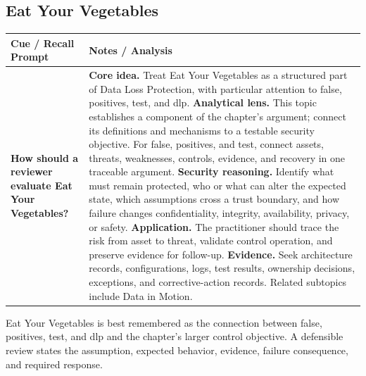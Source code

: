 \documentclass[11pt]{article}
\newcommand{\CornellHeader}{%
\rowcolor{Navy}\color{white}\bfseries Cue / Recall Prompt & \color{white}\bfseries Notes / Analysis\\\hline}
\newcommand{\CornellRow}[2]{%
\cellcolor{CueGray}\RaggedRight\textbf{#1} & \RaggedRight #2\\\hline}
\begin{document}
\subsection*{Eat Your Vegetables}
\begin{longtable}{>{\RaggedRight\arraybackslash}p{}|>{\RaggedRight\arraybackslash}p{}}
\CornellHeader
\CornellRow{How should a reviewer evaluate Eat Your Vegetables?}{\textbf{Core idea.} Treat Eat Your Vegetables as a structured part of Data Loss Protection, with particular attention to false, positives, test, and dlp. \textbf{Analytical lens.} This topic establishes a component of the chapter's argument; connect its definitions and mechanisms to a testable security objective. For false, positives, and test, connect assets, threats, weaknesses, controls, evidence, and recovery in one traceable argument. \textbf{Security reasoning.} Identify what must remain protected, who or what can alter the expected state, which assumptions cross a trust boundary, and how failure changes confidentiality, integrity, availability, privacy, or safety. \textbf{Application.} The practitioner should trace the risk from asset to threat, validate control operation, and preserve evidence for follow-up. \textbf{Evidence.} Seek architecture records, configurations, logs, test results, ownership decisions, exceptions, and corrective-action records. Related subtopics include Data in Motion.}
\end{longtable}
\begin{topicsummary}
Eat Your Vegetables is best remembered as the connection between false, positives, test, and dlp and the chapter's larger control objective. A defensible review states the assumption, expected behavior, evidence, failure consequence, and required response.
\end{topicsummary}
\end{document}
